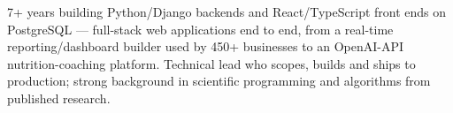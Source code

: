 \documentclass[bib=normal,page2=display,nophoto]{Code/CV}
\begin{document}


{\footnotesize 7+ years building Python/Django backends and React/TypeScript front ends on PostgreSQL --- full-stack web
applications end to end, from a real-time reporting/dashboard builder used by 450+
businesses to an OpenAI-API nutrition-coaching platform.
 Technical lead who scopes, builds and ships to production; strong background in scientific programming and algorithms from published research.\par}




\clearpage


%

\end{document}
